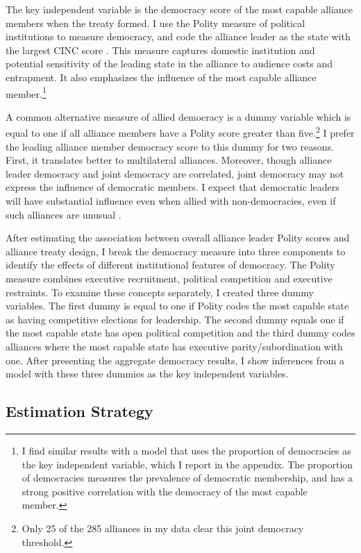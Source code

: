 \documentclass[12pt]{article}
\begin{document}
The key independent variable is the democracy score of the most capable alliance members when the treaty formed. 
I use the Polity measure of political institutions to measure democracy, and code the alliance leader as the state with the largest CINC score \citep{SingerCINC1988}.
This measure captures domestic institution and potential sensitivity of the leading state in the alliance to audience costs and entrapment.
It also emphasizes the influence of the most capable alliance member.\footnote{I find similar results with a model that uses the proportion of democracies as the key independent variable, which I report in the appendix. The proportion of democracies measures the prevalence of democratic membership, and has a strong positive correlation with the democracy of the most capable member.}    


A common alternative measure of allied democracy is a dummy variable which is equal to one if all alliance members have a Polity score greater than five.\footnote{Only 25 of the 285 alliances in my data clear this joint democracy threshold.}
I prefer the leading alliance member democracy score to this dummy for two reasons.
First, it translates better to multilateral alliances. 
Moreover, though alliance leader democracy and joint democracy are correlated, joint democracy may not express the influence of democratic members. 
I expect that democratic leaders will have substantial influence even when allied with non-democracies, even if such alliances are unusual \citep{Leeds1999}.


After estimating the association between overall alliance leader Polity scores and alliance treaty design, I break the democracy measure into three components to identify the effects of different institutional features of democracy.  
The Polity measure combines executive recruitment, political competition and executive restraints. 
To examine these concepts separately, I created three dummy variables. 
The first dummy is equal to one if Polity codes the most capable state as having competitive elections for leadership.
The second dummy equals one if the most capable state has open political competition and the third dummy codes alliances where the most capable state has executive parity/subordination with one. 
After presenting the aggregate democracy results, I show inferences from a model with these three dummies as the key independent variables.



\subsection{Estimation Strategy}
\end{document}
